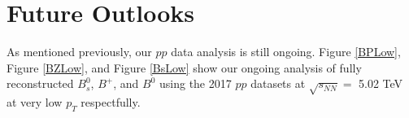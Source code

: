 









\section{Future Outlooks}

As mentioned previously, our $pp$ data analysis is still ongoing. Figure \ref{BPLow}, Figure \ref{BZLow}, and Figure \ref{BsLow} show our ongoing analysis of fully reconstructed $B^0_s$, $B^+$, and $B^0$ using the 2017 $pp$ datasets at $\sqrt {s_{NN}} = $ 5.02 TeV at very low $p_T$ respectfully.


